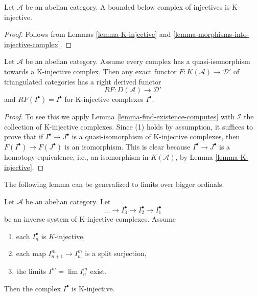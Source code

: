 \begin{lemma}
\label{lemma-bounded-below-injectives-K-injective}
Let $\mathcal{A}$ be an abelian category. A bounded below complex of
injectives is K-injective.
\end{lemma}

\begin{proof}
Follows from
Lemmas \ref{lemma-K-injective} and
\ref{lemma-morphisms-into-injective-complex}.
\end{proof}

\begin{lemma}
\label{lemma-enough-K-injectives-implies}
Let $\mathcal{A}$ be an abelian category.
Assume every complex has a quasi-isomorphism towards a K-injective complex.
Then any exact functor $F : K(\mathcal{A}) \to \mathcal{D}'$ of triangulated
categories has a right derived functor
$$
RF : D(\mathcal{A}) \longrightarrow \mathcal{D}'
$$
and $RF(I^\bullet) = I^\bullet$ for K-injective complexes $I^\bullet$.
\end{lemma}

\begin{proof}
To see this we apply
Lemma \ref{lemma-find-existence-computes}
with $\mathcal{I}$ the collection of K-injective complexes. Since (1)
holds by assumption, it suffices to prove that if $I^\bullet \to J^\bullet$
is a quasi-isomorphism of K-injective complexes, then
$F(I^\bullet) \to F(J^\bullet)$ is an isomorphism. This is clear because
$I^\bullet \to J^\bullet$ is a homotopy equivalence, i.e., an
isomorphism in $K(\mathcal{A})$, by
Lemma \ref{lemma-K-injective}.
\end{proof}

\noindent
The following lemma can be generalized to limits over bigger ordinals.

\begin{lemma}
\label{lemma-limit-K-injectives}
Let $\mathcal{A}$ be an abelian category. Let
$$
\ldots \to I_3^\bullet \to I_2^\bullet \to I_1^\bullet
$$
be an inverse system of K-injective complexes. Assume
\begin{enumerate}
\item each $I_n^\bullet$ is $K$-injective,
\item each map $I_{n + 1}^m \to I_n^m$ is a split surjection,
\item the limits $I^m = \lim I_n^m$ exist.
\end{enumerate}
Then the complex $I^\bullet$ is K-injective.
\end{lemma}

